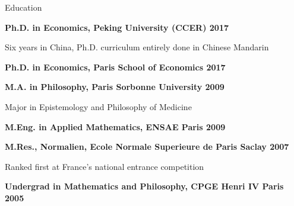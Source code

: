 \documentclass[usegeometry, 10pt, a4paper]{cv} %
\newcommand{\activite}[1]{\textbf{#1}\ }
\newenvironment{normal-itemize}{
\begin{itemize}
     \setlength{\itemsep}{1.3mm}
     \setlength{\parskip}{0pt}
     \setlength{\parsep}{0pt}}
{\end{itemize}
}
\begin{document}
\begin{rubriquetableau}[0.95\textwidth]{Education}\\
\vspace{-0.8cm}

\activite{Ph.D. in Economics, Peking University (CCER) \hfill 2017}\\
\vspace{-0.4cm}
\renewcommand\labelitemi{}
\begin{normal-itemize}
\small
\vspace{-0.3cm}
\item Six years in China, Ph.D. curriculum entirely done in Chinese Mandarin
\end{normal-itemize}
\vspace{0.1cm}

\activite{Ph.D. in Economics, Paris School of Economics \hfill 2017}\\
\vspace{0.1cm}

\activite{M.A. in Philosophy, Paris Sorbonne University \hfill 2009}\\
\vspace{-0.2cm}
\renewcommand\labelitemi{}
\begin{normal-itemize}
\small
\vspace{-0.3cm}
\item Major in Epistemology and Philosophy of Medicine
\end{normal-itemize}
\vspace{0.1cm}

\activite{M.Eng. in Applied Mathematics, ENSAE Paris \hfill 2009}\\
\vspace{0.1cm}

\activite{M.Res., Normalien, Ecole Normale Superieure de Paris Saclay \hfill 2007}\\
\vspace{-0.2cm}
\renewcommand\labelitemi{}
\begin{normal-itemize}
\small
\vspace{-0.3cm}
\item Ranked first at France's national entrance competition 
\end{normal-itemize}
\vspace{0.1cm}

\activite{Undergrad in Mathematics and Philosophy, CPGE Henri IV Paris \hfill
  2005}\\

\normalsize
\end{rubriquetableau}
\end{document}
